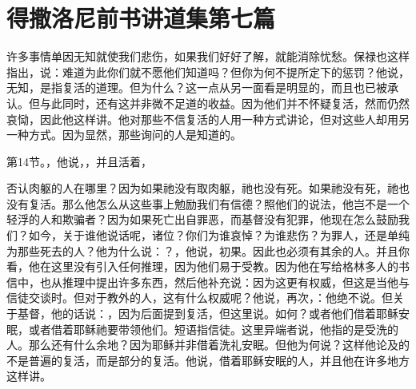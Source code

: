 

\section{得撒洛尼前书讲道集第七篇}

\par

\par

许多事情单因无知就使我们悲伤，如果我们好好了解，就能消除忧愁。保禄也这样指出，说：难道为此你们就不愿他们知道吗？但你为何不提所定下的惩罚？他说，无知，是指复活的道理。但为什么？这一点从另一面看是明显的，而且也已被承认。但与此同时，还有这并非微不足道的收益。因为他们并不怀疑复活，然而仍然哀恸，因此他这样讲。他对那些不信复活的人用一种方式讲论，但对这些人却用另一种方式。因为显然，那些询问的人是知道的。\par

第14节。，他说，，并且活着，\par

否认肉躯的人在哪里？因为如果祂没有取肉躯，祂也没有死。如果祂没有死，祂也没有复活。那么他怎么从这些事上勉励我们有信德？照他们的说法，他岂不是一个轻浮的人和欺骗者？因为如果死亡出自罪恶，而基督没有犯罪，他现在怎么鼓励我们？如今，关于谁他说话呢，诸位？你们为谁哀悼？为谁悲伤？为罪人，还是单纯为那些死去的人？他为什么说：？，他说，初果。因此也必须有其余的人。并且你看，他在这里没有引入任何推理，因为他们易于受教。因为他在写给格林多人的书信中，也从推理中提出许多东西，然后他补充说：因为这更有权威，但这是当他与信徒交谈时。但对于教外的人，这有什么权威呢？他说，再次，：他绝不说。但关于基督，他的话说：，因为后面提到复活，但这里说。如何？或者他们借着耶稣安眠，或者借着耶稣祂要带领他们。短语指信徒。这里异端者说，他指的是受洗的人。那么还有什么余地？因为耶稣并非借着洗礼安眠。但他为何说？这样他论及的不是普遍的复活，而是部分的复活。他说，借着耶稣安眠的人，并且他在许多地方这样讲。\par

